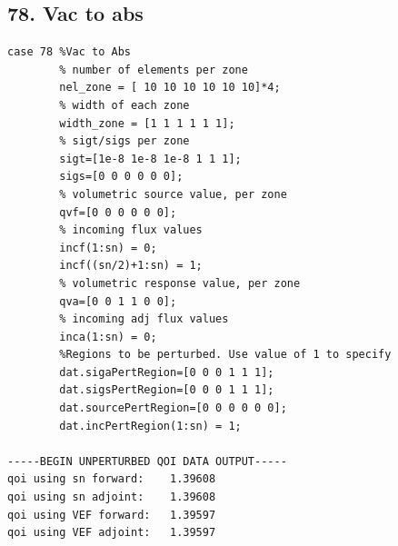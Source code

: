 \documentclass{article}
\begin{document}
\subsection{78. Vac to abs}
\begin{verbatim}
case 78 %Vac to Abs
        % number of elements per zone
        nel_zone = [ 10 10 10 10 10 10]*4;
        % width of each zone
        width_zone = [1 1 1 1 1 1];
        % sigt/sigs per zone
        sigt=[1e-8 1e-8 1e-8 1 1 1];
        sigs=[0 0 0 0 0 0];
        % volumetric source value, per zone
        qvf=[0 0 0 0 0 0];
        % incoming flux values
        incf(1:sn) = 0;
        incf((sn/2)+1:sn) = 1;
        % volumetric response value, per zone
        qva=[0 0 1 1 0 0];
        % incoming adj flux values
        inca(1:sn) = 0;
        %Regions to be perturbed. Use value of 1 to specify
        dat.sigaPertRegion=[0 0 0 1 1 1];
        dat.sigsPertRegion=[0 0 0 1 1 1];
        dat.sourcePertRegion=[0 0 0 0 0 0];
        dat.incPertRegion(1:sn) = 1;
        
-----BEGIN UNPERTURBED QOI DATA OUTPUT----- 
qoi using sn forward: 	 1.39608 
qoi using sn adjoint: 	 1.39608 
qoi using VEF forward: 	 1.39597 
qoi using VEF adjoint: 	 1.39597 
\end{verbatim}
\end{document}
